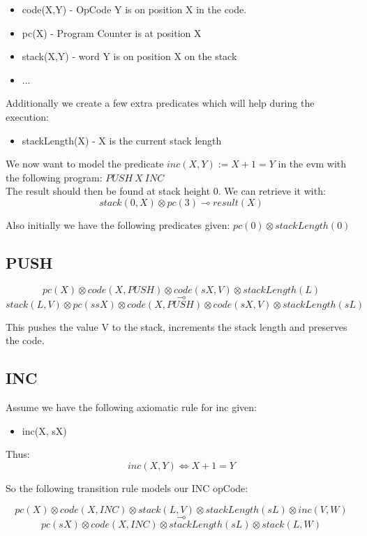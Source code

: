 \documentclass[sigconf]{acmart}
\begin{document}
\begin{itemize}
  \item code(X,Y) - OpCode Y is on position X in the code.
  \item pc(X) - Program Counter is at position X
  \item stack(X,Y) - word Y is on position X on the stack
  \item ...
\end{itemize}


Additionally we create a few extra predicates which will help during the execution:
\begin{itemize}
  \item stackLength(X) - X is the current stack length
\end{itemize}

We now want to model the predicate $inc(X,Y) := X + 1 = Y$ in the evm with the following program: $PUSH\ X\ INC$\\ The result should then be found at stack height 0. We can retrieve it with:
\[ stack(0, X) \otimes pc(3) \multimap result(X) \]


Also initially we have the following predicates given:
$pc(0) \otimes stackLength(0)$

\subsection*{PUSH}

  $$ pc(X)\otimes code(X, PUSH) \otimes code(sX, V)\otimes stackLength(L)$$
  $$\multimap$$
  $$stack(L, V)\otimes pc(ssX)\otimes code(X, PUSH)\otimes code(sX, V)\otimes stackLength(sL)$$

This pushes the value V to the stack, increments the stack length and preserves the code.

\subsection*{INC}

Assume we have the following axiomatic rule for inc given:

\begin{itemize}
  \item inc(X, sX)
\end{itemize}

Thus:
  $$ inc(X, Y) \Leftrightarrow X + 1 = Y$$


So the following transition rule models our INC opCode:

  $$pc(X) \otimes code(X, INC) \otimes stack(L, V) \otimes stackLength(sL) \otimes inc(V, W)$$
  $$\multimap$$
  $$pc(sX) \otimes code(X, INC) \otimes stackLength(sL) \otimes stack(L, W)$$
\end{document}

